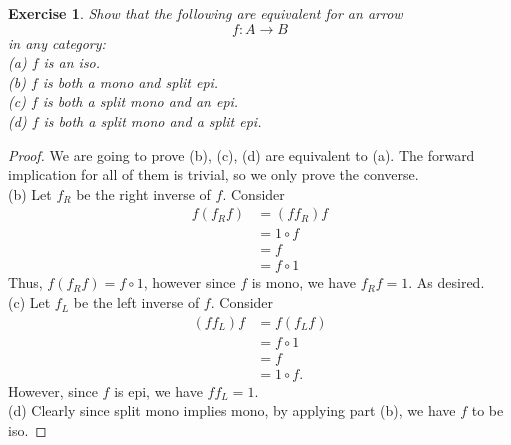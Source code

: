\documentclass[a4paper, 11pt]{book}
\theoremstyle{plain}
\newtheorem{exercise}{Exercise}[chapter]
\theoremstyle{plain}
\newcommand{\arr}{\rightarrow}
\begin{document}
  \begin{exercise}
    Show that the following are equivalent for an arrow $$f:A \arr B$$ in any category: \\
    (a) $f$ is an iso. \\
    (b) $f$ is both a mono and split epi. \\
    (c) $f$ is both a split mono and an epi. \\
    (d) $f$ is both a split mono and a split epi.
  \end{exercise}

  \begin{proof} We are going to prove (b), (c), (d) are equivalent to (a). The forward implication for all of them is trivial, so we only prove the converse. \\

    (b) Let $f_R$ be the right inverse of $f$. Consider 
    \begin{align*}
      f(f_R f) &=(f f_R)f \\
      &= 1 \circ f \\
      &=f \\
      &= f \circ 1
    \end{align*} 
    Thus, $f (f_R f)= f \circ 1$, however since $f$ is mono, we have $f_R f =1$. As desired. \\

    (c) Let $f_L$ be the left inverse of $f$. Consider 
    \begin{align*}
      (f f_L)f &= f (f_L f) \\
      &= f \circ 1 \\
      &= f  \\
      &= 1 \circ f.
    \end{align*}
    However, since $f$ is epi, we have $f f_L=1$. \\

    (d) Clearly since split mono implies mono, by applying part (b), we have $f$ to be iso.
  \end{proof}
\end{document}
